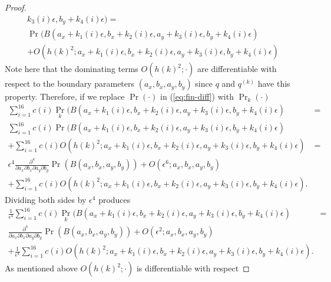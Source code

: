 \begin{proof}
\begin{multline*}
    k_3(i)\epsilon, b_y + k_4(i)\epsilon) = \\
    \Pr(B(a_x + k_1(i)\epsilon, b_x + k_2(i)\epsilon, a_y +
    k_3(i)\epsilon, b_y + k_4(i)\epsilon) \\
    + O(h(k)^2; a_x + k_1(i)\epsilon, b_x + k_2(i)\epsilon, a_y + k_3(i)\epsilon, b_y + k_4(i)\epsilon) 
  \end{multline*}
  Note here that the dominating terms $O(h(k)^2; \cdot)$ are
  differentiable with respect to the boundary parameters
  $(a_x, b_x, a_y, b_y)$ since $q$ and $q^{(k)}$ have this
  property. Therefore, if we replace $\Pr(\cdot)$ in
  (\ref{eq:fin-diff}) with $\Pr_k(\cdot)$
  \begin{align*}
    \sum_{i=1}^{16} c(i) \Pr_k(B(a_x + k_1(i)\epsilon, b_x +
    k_2(i)\epsilon, a_y + k_3(i)\epsilon, b_y + k_4(i)\epsilon) &= \\
    \sum_{i=1}^{16} c(i) \Pr(B(a_x + k_1(i)\epsilon, b_x +
    k_2(i)\epsilon, a_y + k_3(i)\epsilon, b_y + k_4(i)\epsilon) &  \\
    + \sum_{i=1}^{16} c(i) O(h(k)^2; a_x + k_1(i)\epsilon, b_x +
    k_2(i)\epsilon, a_y + k_3(i)\epsilon, b_y + k_4(i)\epsilon) &= \\
    \epsilon^4 \frac{\partial^4}{\partial a_x \partial b_x \partial
    a_y \partial b_y} \Pr(B(a_x, b_x, a_y, b_y)) + O(\epsilon^6 ;
    a_x, b_x, a_y, b_y) & \\
    + \sum_{i=1}^{16} c(i) O(h(k)^2; a_x + k_1(i)\epsilon, b_x +
    k_2(i)\epsilon, a_y + k_3(i)\epsilon, b_y + k_4(i)\epsilon). &
  \end{align*}
  Dividing both sides by $\epsilon^4$ produces
  \begin{align*}
    \frac{1}{\epsilon^4} \sum_{i=1}^{16} c(i) \Pr_k(B(a_x + k_1(i)\epsilon, b_x +
    k_2(i)\epsilon, a_y + k_3(i)\epsilon, b_y + k_4(i)\epsilon) &= \\
    \frac{\partial^4}{\partial a_x \partial b_x \partial
    a_y \partial b_y} \Pr(B(a_x, b_x, a_y, b_y)) + O(\epsilon^2;
    a_x, b_x, a_y, b_y) \\
    + \frac{1}{\epsilon^4}\sum_{i=1}^{16} c(i) O(h(k)^2; a_x + k_1(i)\epsilon, b_x +
    k_2(i)\epsilon, a_y + k_3(i)\epsilon, b_y + k_4(i)\epsilon).
  \end{align*}
  As mentioned above $O(h(k)^2; \cdot)$ is differentiable with respect

\end{proof}
